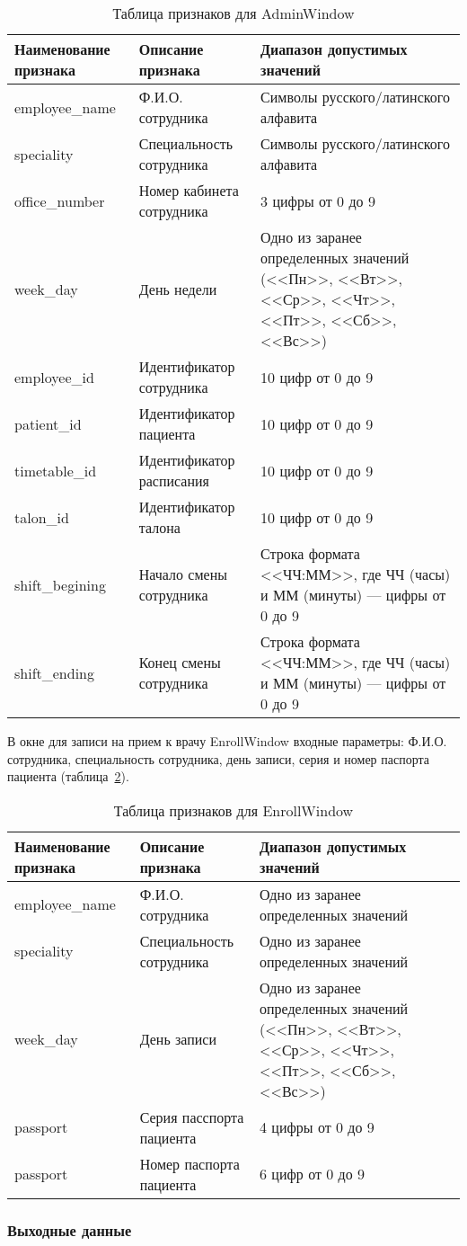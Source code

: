 \begin{table}[ht]
\caption{Таблица признаков для AdminWindow}
\label{tab:tab_1}
\begin{center}
\begin{tabularx}{\linewidth}{|X|X|X|}
\hline
Наименование признака & Описание признака & Диапазон допустимых значений\\
\hline
 employee\_name & Ф.И.О. сотрудника & Символы русского/латинского алфавита\\
\hline
 speciality & Специальность сотрудника & Символы русского/латинского алфавита\\
\hline
 office\_number & Номер кабинета сотрудника & 3 цифры от 0 до 9\\
\hline
 week\_day & День недели & Одно из заранее определенных значений (<<Пн>>, <<Вт>>, <<Ср>>, <<Чт>>, <<Пт>>, <<Сб>>, <<Вс>>)\\
\hline
 employee\_id & Идентификатор сотрудника & 10 цифр от 0 до 9 \\
\hline
 patient\_id & Идентификатор пациента & 10 цифр от 0 до 9 \\
\hline
 timetable\_id & Идентификатор расписания & 10 цифр от 0 до 9 \\
\hline
 talon\_id & Идентификатор талона & 10 цифр от 0 до 9 \\
\hline
 shift\_begining & Начало смены сотрудника & Строка формата <<ЧЧ:ММ>>, где ЧЧ (часы) и ММ (минуты) --- цифры от 0 до 9 \\
\hline
 shift\_ending & Конец смены сотрудника & Строка формата <<ЧЧ:ММ>>, где ЧЧ (часы) и ММ (минуты) --- цифры от 0 до 9\\
\hline
\end{tabularx}
\end{center}
\end{table}

В окне для записи на прием к врачу EnrollWindow входные параметры: Ф.И.О. сотрудника, специальность сотрудника, день записи, серия и номер паспорта пациента (таблица~\ref{tab:tab_2}). 

\begin{table}[ht]
\caption{Таблица признаков для EnrollWindow}
\label{tab:tab_2}
\begin{center}
\begin{tabularx}{\linewidth}{|X|X|X|}
\hline
Наименование признака & Описание признака & Диапазон допустимых значений\\
\hline
 employee\_name & Ф.И.О. сотрудника & Одно из заранее определенных значений\\
\hline
 speciality & Специальность сотрудника & Одно из заранее определенных значений\\
\hline
 week\_day & День записи & Одно из заранее определенных значений (<<Пн>>, <<Вт>>, <<Ср>>, <<Чт>>, <<Пт>>, <<Сб>>, <<Вс>>)\\
\hline
 passport & Серия пасспорта пациента & 4 цифры от 0 до 9 \\
\hline
 passport & Номер паспорта пациента & 6 цифр от 0 до 9 \\
\hline
\end{tabularx}
\end{center}
\end{table}



\subsubsection{Выходные данные}
